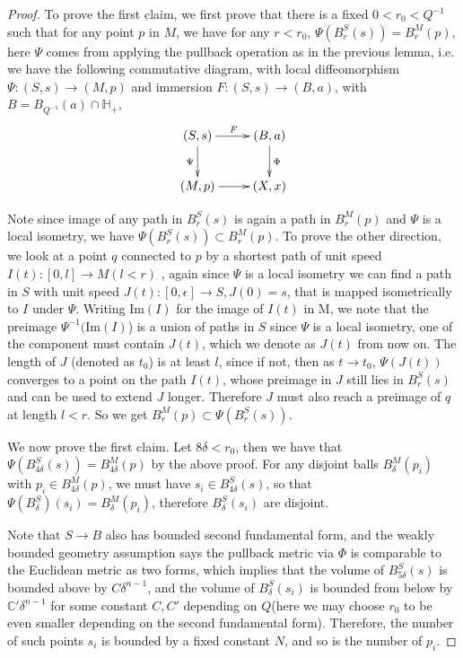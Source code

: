 \documentclass[12pt]{amsart}
\newcommand{\C}{\mathbb{C}}
\newcommand{\HH}{\mathbb{H}}
\numberwithin{equation}{section}
\begin{document}
    \begin{proof}
		To prove the first claim, we first prove that there is a fixed $0<r_0<Q^{-1}$ such that for any point  $p$ in $M$, we have for any $r<r_0$, $\Psi(B^S_r(s)) = B^M_r(p)$, here $\Psi$ comes from applying the pullback operation as in the previous lemma, i.e. we have the following commutative diagram, with local diffeomorphism $\Psi: (S,s) \rightarrow (M,p)$ and immersion $F:(S,s)\rightarrow (B,a)$, with $B=B_{Q^{-1}}(a) \cap \HH_+$,
		\[
		\xymatrix{
		(S,s) \ar[r]^{F} \ar[d]_{\Psi}& (B,a)\ar[d]^{\Phi}\\
		(M,p) \ar[r] & (X,x)
		}
		\]


		Note since image of any path in $B^S_r(s)$ is again a path in $B^M_r(p)$ and $\Psi$ is a local isometry, we have $\Psi(B^S_r(s)) \subset B^M_r(p)$. To prove the other direction, we look at a point $q$ connected to $p$ by a shortest path of unit speed $I(t):[0,l] \rightarrow M(l<r)$ , again since $\Psi$ is a local isometry we can find a path in $S$ with unit speed $J(t):[0,\epsilon] \rightarrow S, J(0)=s$, that is mapped isometrically to $I$ under $\Psi$. Writing Im$(I)$ for the image of $I(t)$ in M, we note that the preimage $\Psi^{-1}($Im$(I)$) is a union of paths in $S$ since $\Psi$ is a local isometry, one of the component must contain $J(t)$, which we denote as $J(t)$ from now on. The length of $J$ (denoted as $t_0$) is at least $l$, since if not, then as $t\rightarrow t_0$, $\Psi(J(t))$ converges to a point on the path $I(t)$, whose preimage in $J$ still lies in $B^S_r(s)$ and can be used to extend $J$ longer. Therefore $J$ must also reach a preimage of $q$ at length $l<r$.
		So we get $B^M_r(p)\subset\Psi(B^S_r(s))$.


		We now prove the first claim. Let $8\delta < r_0$, then we have that $\Psi(B^S_{4\delta}(s))=B^M_{4\delta}(p)$ by the above proof. For any disjoint balls $B^M_{\delta}(p_i)$ with $p_i \in B^M_{4\delta}(p)$, we must have $s_i \in B^S_{4\delta}(s)$, so that $\Psi(B^S_{\delta})(s_i)=B^M_{\delta}(p_i)$, therefore $B^S_{\delta}(s_i)$ are disjoint. 
	
		Note that $S \rightarrow B$ also has bounded second fundamental form, and the weakly bounded geometry assumption says the pullback metric via $\Phi$ is comparable to the Euclidean metric as two forms, which
		implies that the volume of $B^S_{5\delta}(s)$ is bounded above by $C \delta^{n-1}$, and the volume of $B^S_{\delta}(s_i)$ is bounded from below by $\C' \delta^{n-1}$ for some constant $C,C'$ depending on $Q$(here we may choose $r_0$ to be even smaller depending on the second fundamental form). Therefore, the number of such points $s_i$ is bounded by a fixed constant $N$, and so is the number of $p_i$.


\end{proof}
\end{document}

